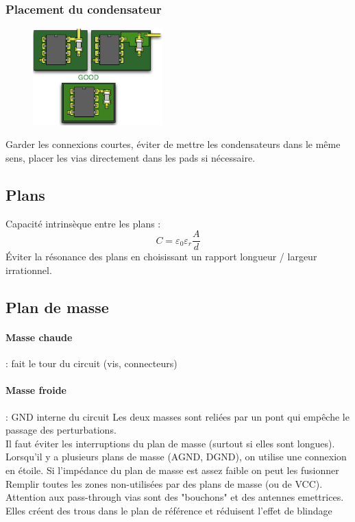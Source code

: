 \documentclass[resume]{subfiles}
\begin{document}
\begin{multicols}{3}
\subsubsection{Placement du condensateur}
\begin{figure}[H]
\centering
\includegraphics[width=5.00cm]{img_9.png}
\end{figure}
Garder les connexions courtes, éviter de mettre les condensateurs dans le même sens, placer les vias directement dans les pads si nécessaire.
\subsection{Plans}
Capacité intrinsèque entre les plans :
$$C=\varepsilon_0\varepsilon_r\frac{A}{d}$$
Éviter la résonance des plans en choisissant un rapport longueur / largeur irrationnel.
\subsection{Plan de masse}
\paragraph{Masse chaude} : fait le tour du circuit (vis, connecteurs)
\paragraph{Masse froide} : GND interne du circuit
Les deux masses sont reliées par un pont qui empêche le passage des perturbations.\\
Il faut éviter les interruptions du plan de masse (surtout si elles sont longues).\\
Lorsqu'il y a plusieurs plans de masse (AGND, DGND), on utilise une connexion en étoile. Si l'impédance du plan de masse est assez faible on peut les fusionner\\
Remplir toutes les zones non-utilisées par des plans de masse (ou de VCC).\\
Attention aux pass-through vias sont des "bouchons" et des antennes emettrices. Elles créent des trous dans le plan de référence et réduisent l'effet de blindage

\end{multicols}
\end{document}
